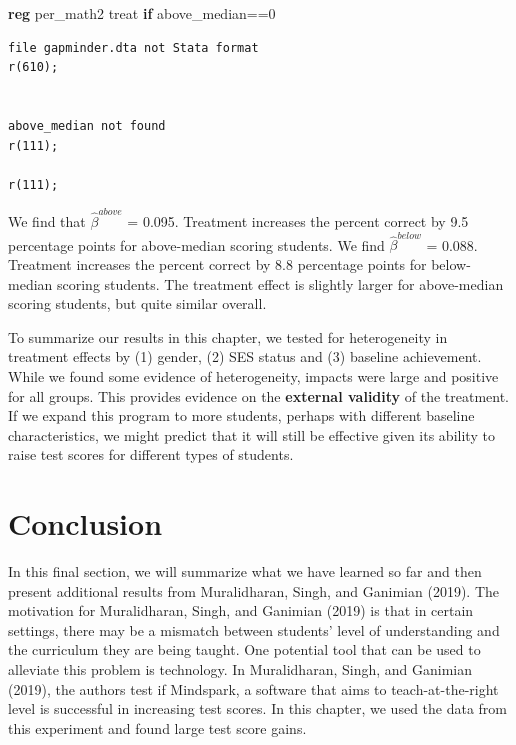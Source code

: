 \documentclass[
]{book}
\newenvironment{Shaded}{\begin{snugshade}}{\end{snugshade}}
\newcommand{\KeywordTok}[1]{\textcolor[rgb]{0.13,0.29,0.53}{\textbf{#1}}}
\newcommand{\NormalTok}[1]{#1}
\begin{document}
\begin{Shaded}
\begin{Highlighting}[]
\KeywordTok{reg}\NormalTok{ per\_math2 treat }\KeywordTok{if}\NormalTok{ above\_median==0}
\end{Highlighting}
\end{Shaded}

\begin{verbatim}
file gapminder.dta not Stata format
r(610);


above_median not found
r(111);

r(111);
\end{verbatim}

We find that \(\hat{\beta}^{above}\) = 0.095. Treatment increases the percent correct by 9.5 percentage points for above-median scoring students. We find \(\hat{\beta}^{below}\) = 0.088. Treatment increases the percent correct by 8.8 percentage points for below-median scoring students. The treatment effect is slightly larger for above-median scoring students, but quite similar overall.

To summarize our results in this chapter, we tested for heterogeneity in treatment effects by (1) gender, (2) SES status and (3) baseline achievement. While we found some evidence of heterogeneity, impacts were large and positive for all groups. This provides evidence on the \textbf{external validity} of the treatment. If we expand this program to more students, perhaps with different baseline characteristics, we might predict that it will still be effective given its ability to raise test scores for different types of students.

\section{Conclusion}\label{conclusion-2}

In this final section, we will summarize what we have learned so far and then present additional results from Muralidharan, Singh, and Ganimian (2019). The motivation for Muralidharan, Singh, and Ganimian (2019) is that in certain settings, there may be a mismatch between students' level of understanding and the curriculum they are being taught. One potential tool that can be used to alleviate this problem is technology. In Muralidharan, Singh, and Ganimian (2019), the authors test if Mindspark, a software that aims to teach-at-the-right level is successful in increasing test scores. In this chapter, we used the data from this experiment and found large test score gains.
\end{document}
